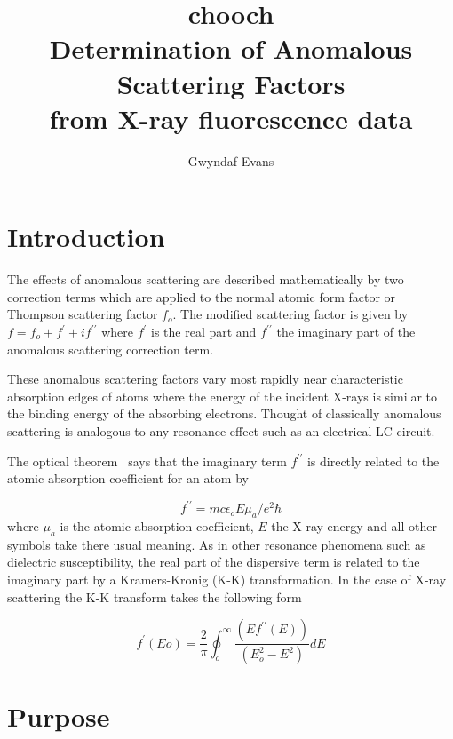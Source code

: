 \documentclass[a4paper]{article}
\begin{document}

\title{{\bf chooch} \\
Determination of Anomalous Scattering Factors \\
from X-ray fluorescence data}
\author{Gwyndaf Evans}
\maketitle

\section*{Introduction}

The effects of anomalous scattering are described mathematically by
two correction terms which are applied to the normal atomic form
factor or Thompson scattering factor $f_{o}$. The modified scattering
factor is given by $f = f_{o} + f^{\prime} + if^{\prime\prime}$ where
$f^{\prime}$ is the real part and $f^{\prime\prime}$ the imaginary
part of the anomalous scattering correction term.

These anomalous scattering factors vary most rapidly near
characteristic absorption edges of atoms where the energy of the
incident X-rays is similar to the binding energy of the absorbing
electrons. Thought of classically anomalous scattering is analogous
to any resonance effect such as an electrical LC circuit.

The optical theorem~\cite{james69:_optic_princ_diffr_x} says that the imaginary term
$f^{\prime\prime}$ is directly related to the atomic absorption
coefficient for an atom by

\begin{equation}
f^{\prime\prime} = mc \epsilon_{o}E\mu_{a}/e^{2}\hbar
\end{equation}
where $\mu_{a}$ is the atomic absorption coefficient, $E$ the X-ray
energy and all other symbols take there usual meaning. As in other
resonance phenomena such as dielectric susceptibility, the real part
of the dispersive term is related to the imaginary part by a
Kramers-Kronig (K-K) transformation. In the case of X-ray scattering
the K-K transform takes the following form

\begin{equation}
f^{\prime}(Eo)= \frac{2}{\pi}\oint_{o}^{\infty}
                \frac{(E f^{\prime\prime}(E))}{(E_{o}^{2} - E^{2})}dE 
\label{KK}
\end{equation}

\section*{Purpose}
\end{document}
